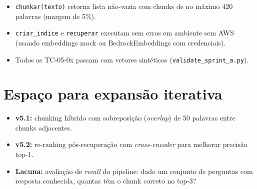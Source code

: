 \begin{itemize}[leftmargin=*]
  \item \texttt{chunkar(texto)} retorna lista n\~ao-vazia com chunks
        de no m\'aximo 420 palavras (margem de 5\%).
  \item \texttt{criar\_indice} e \texttt{recuperar} executam sem erros
        em ambiente sem AWS (usando embeddings mock ou BedrockEmbeddings
        com credenciais).
  \item Todos os TC-05-0x passam com vetores sint\'eticos
        (\texttt{validate\_sprint\_a.py}).
\end{itemize}

\section{Espa\c{c}o para expans\~ao iterativa}

\begin{itemize}[leftmargin=*]
  \item \textbf{v5.1:} chunking h\'ibrido com sobreposição (\textit{overlap})
        de 50 palavras entre chunks adjacentes.
  \item \textbf{v5.2:} re-ranking p\'os-recupera\c{c}\~ao com
        \textit{cross-encoder} para melhorar precis\~ao top-1.
  \item \textbf{Lacuna:} avalia\c{c}\~ao de \textit{recall} do pipeline:
        dado um conjunto de perguntas com resposta conhecida, quantas
        t\^em o chunk correto no top-3?
\end{itemize}
